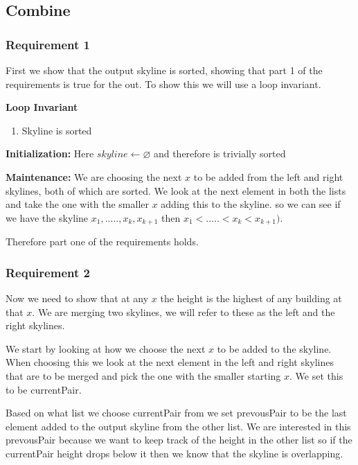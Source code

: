 \documentclass{article}
\begin{document}
		\subsection{Combine}
		
			\subsubsection{Requirement 1}
			First we show that the output skyline is sorted, showing that part 1 of the requirements is true for the out. To show this we will use a loop invariant.\newline
			
			\textbf{Loop Invariant}
			\begin{enumerate}
				\item Skyline is sorted
			\end{enumerate}				
			
			\textbf{Initialization:} Here $skyline \gets \varnothing$ and therefore is trivially sorted\newline
			
			\textbf{Maintenance:} We are choosing the next $x$ to be added from the left and right skylines, both of which are sorted. We look at the next element in both the lists and take the one with the smaller $x$ adding this to the skyline. so we can see if we have the skyline ${x_1, ....., x_k, x_{k+1}}$ then $ x_1 < ..... < x_k < x_{k+1})$.\newline
			
			Therefore part one of the requirements holds.
			
		
			\subsubsection{Requirement 2}
			Now we need to show that at any $x$ the height is the highest of any building at that $x$. We are merging two skylines, we will refer to these as the left and the right skylines.
			
			We start by looking at how we choose the next $x$ to be added to the skyline. When choosing this we look at the next element in the left and right skylines that are to be merged and pick the one with the smaller starting $x$. We set this to be currentPair.\newline
			
			Based on what list we choose currentPair from we set prevousPair to be the last element added to the output skyline from the other list. We are interested in this prevousPair because we want to keep track of the height in the other list so if the currentPair height drops below it then we know that the skyline is overlapping.\newline
			
\end{document}
